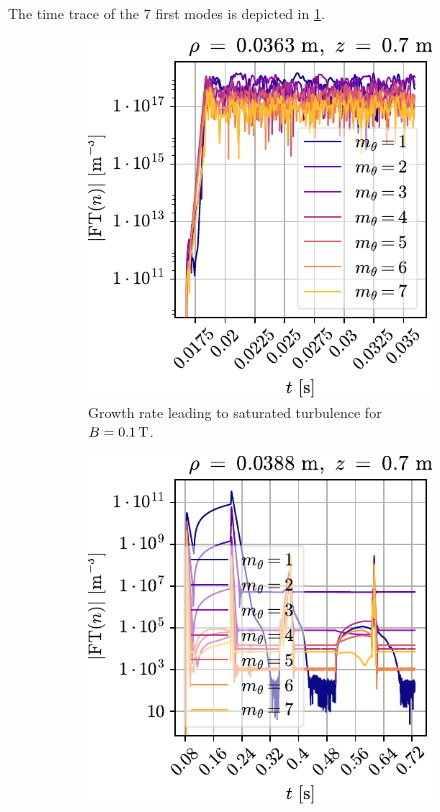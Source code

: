 The time trace of the $7$ first modes is depicted in \cref{fig:fourierUnstable}.
%
\begin{figure}[htbp]
    \centering
    \begin{subfigure}[h]{0.45\textwidth}
        \hspace*{-1cm}
        \centering
        \includegraphics{fig/results/fourierModes/unstable}
        \caption{Growth rate leading to saturated turbulence for $B=0.1\, \text{T}$.}
        \label{fig:fourierUnstable}
    \end{subfigure}
    \hfill
    \begin{subfigure}[h]{0.45\textwidth}
        \hspace*{-1cm}
        \centering
        \includegraphics{fig/results/fourierModes/stable}

\end{subfigure}
\end{figure}
